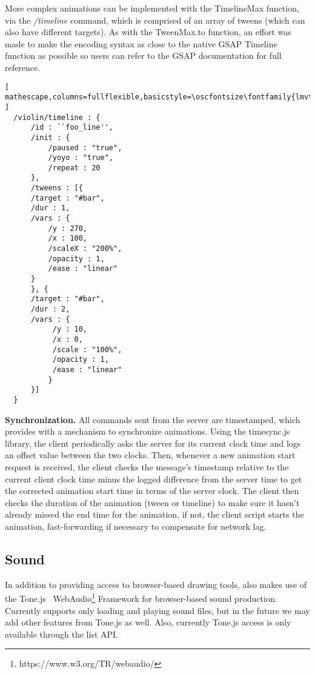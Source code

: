 More complex animations can be implemented with the TimelineMax function, via the \drawsocket \textit{/timeline} command, which is comprised of an array of tweens (which can also have different targets).
As with the TweenMax.to function, an effort was made to make the encoding syntax as close to the native GSAP Timeline function as possible so users can refer to the GSAP documentation for full reference.

\begin{minipage}{\linewidth}
\begin{lstlisting}[ mathescape,columns=fullflexible,basicstyle=\oscfontsize\fontfamily{lmvtt}\selectfont ]
  /violin/timeline : {
      /id : ``foo_line'',
      /init : {
          /paused : "true",
          /yoyo : "true",
          /repeat : 20
      },
      /tweens : [{
	  /target : "#bar",
	  /dur : 1,
	  /vars : {
	      /y : 270,
	      /x : 100,
	      /scaleX : "200%",
	      /opacity : 1,
	      /ease : "linear"
	  }
      }, {
	  /target : "#bar",
	  /dur : 2,
	  /vars : {
	       /y : 10,
	       /x : 0,
	       /scale : "100%",
	       /opacity : 1,
	       /ease : "linear"
      	  }
      }]
  }
\end{lstlisting}
\end{minipage}

\medskip
\noindent
\textbf{Synchronization.} 
All commands sent from the server are timestamped, which provides \drawsocket with a mechanism to synchronize animations.
Using the timesync.js library, the client periodically asks the server for its current clock time and logs an offset value between the two clocks.
Then, whenever a new animation start request is received, the client checks the message's timestamp relative to the current client clock time minus the logged difference from the server time to get the corrected animation start time in terms of the server clock.
The client then checks the duration of the animation (tween or timeline) to make sure it hasn't already missed the end time for the animation, if not, the client script starts the animation, fast-forwarding if necessary to compensate for network lag.

\subsection{Sound}\label{sec:sound}
In addition to providing access to browser-based drawing tools, \drawsocket also makes use of the Tone.js~\cite{mann2015interactive} WebAudio\footnote{https://www.w3.org/TR/webaudio/} Framework for browser-based sound production.
Currently \drawsocket supports only loading and playing sound files, but in the future we may add other features from Tone.js as well.
Also, currently Tone.js access is only available through the list API. 

